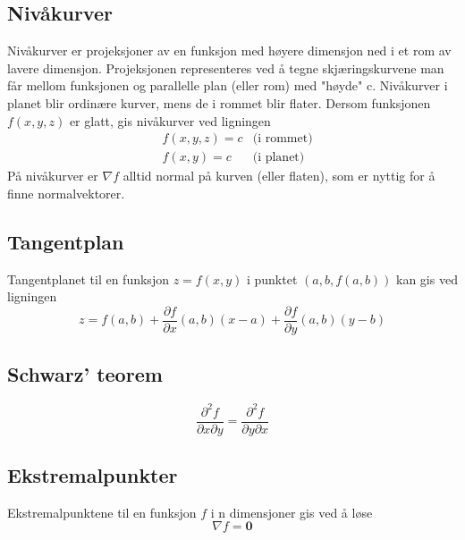\documentclass[fleqn,12pt]{wlscirep}
\begin{document}
\subsection{Nivåkurver}
Nivåkurver er projeksjoner av en funksjon med høyere dimensjon ned i et rom av lavere dimensjon. Projeksjonen representeres ved å tegne skjæringskurvene man får mellom funksjonen og parallelle plan (eller rom) med "høyde" c. Nivåkurver i planet blir ordinære kurver, mens de i rommet blir flater. Dersom funksjonen $f(x,y,z)$ er glatt, gis nivåkurver ved ligningen 
\begin{align*}
    &f(x,y,z) = c & \text{(i rommet)}\\
    &f(x,y) = c & \text{(i planet)}
\end{align*}
På nivåkurver er $\nabla f$ alltid normal på kurven (eller flaten), som er nyttig for å finne normalvektorer.
\subsection{Tangentplan}
Tangentplanet til en funksjon $z = f(x,y)$ i punktet $(a,b, f(a,b))$ kan gis ved ligningen
\begin{equation}
    z = f(a,b) + \frac{\partial f}{\partial x}(a,b)(x-a) + \frac{\partial f}{\partial y} (a,b)(y-b)
\end{equation}

\subsection{Schwarz' teorem}
\begin{equation}
    \frac{\partial^2 f}{\partial x \partial y} = \frac{\partial^2 f}{\partial y \partial x}
\end{equation}
\subsection{Ekstremalpunkter}
Ekstremalpunktene til en funksjon $f$ i n dimensjoner gis ved å løse 
\begin{equation}
    \nabla f = \textbf{0}
\end{equation}
\end{document}
